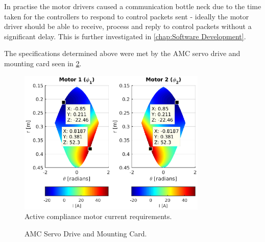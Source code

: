 In practise the motor drivers caused a communication bottle neck due to the time taken for the controllers to respond to control packets sent - ideally the motor driver should be able to receive, process and reply to control packets without a significant delay. This is further investigated in \cref{chap:Software Development}.

The specifications determined above were met by the AMC servo drive and mounting card seen in \cref{fig:AMC Servo Drive and Mounting Card}. 

\begin{figure}
\centering
\includegraphics[width=0.8\textwidth]{images/control/forward-kinematic-motor-current.eps} 
\caption{Active compliance motor current requirements.}
\label{fig:motor-current-requirements}
\end{figure}

\begin{figure}
\centering
{}
\caption{AMC Servo Drive and Mounting Card.}
\label{fig:AMC Servo Drive and Mounting Card}
\end{figure}

